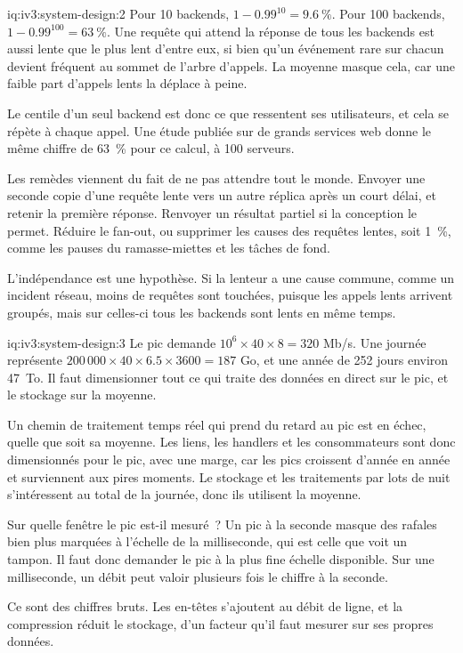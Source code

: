 \begin{solution}{iq:iv3:system-design:2}
Pour 10 backends, $1 - 0.99^{10} = 9.6~\%$. Pour 100 backends, $1 - 0.99^{100} = 63~\%$. Une requête qui attend la réponse de tous les backends est aussi lente que le plus lent d'entre eux, si bien qu'un événement rare sur chacun devient fréquent au sommet de l'arbre d'appels. La moyenne masque cela, car une faible part d'appels lents la déplace à peine.

Le centile d'un seul backend est donc ce que ressentent ses utilisateurs, et cela se répète à chaque appel. Une étude publiée sur de grands services web donne le même chiffre de 63~\% pour ce calcul, à 100 serveurs.

Les remèdes viennent du fait de ne pas attendre tout le monde. Envoyer une seconde copie d'une requête lente vers un autre réplica après un court délai, et retenir la première réponse. Renvoyer un résultat partiel si la conception le permet. Réduire le fan-out, ou supprimer les causes des requêtes lentes, soit 1~\%, comme les pauses du ramasse-miettes et les tâches de fond.

L'indépendance est une hypothèse. Si la lenteur a une cause commune, comme un incident réseau, moins de requêtes sont touchées, puisque les appels lents arrivent groupés, mais sur celles-ci tous les backends sont lents en même temps.

\end{solution}

\begin{solution}{iq:iv3:system-design:3}
Le pic demande $10^6 \times 40 \times 8 = 320$ Mb/s. Une journée représente $200\,000 \times 40 \times 6.5 \times 3600 = 187$ Go, et une année de 252 jours environ 47~To. Il faut dimensionner tout ce qui traite des données en direct sur le pic, et le stockage sur la moyenne.

Un chemin de traitement temps réel qui prend du retard au pic est en échec, quelle que soit sa moyenne. Les liens, les handlers et les consommateurs sont donc dimensionnés pour le pic, avec une marge, car les pics croissent d'année en année et surviennent aux pires moments. Le stockage et les traitements par lots de nuit s'intéressent au total de la journée, donc ils utilisent la moyenne.

Sur quelle fenêtre le pic est-il mesuré~? Un pic à la seconde masque des rafales bien plus marquées à l'échelle de la milliseconde, qui est celle que voit un tampon. Il faut donc demander le pic à la plus fine échelle disponible. Sur une milliseconde, un débit peut valoir plusieurs fois le chiffre à la seconde.

Ce sont des chiffres bruts. Les en-têtes s'ajoutent au débit de ligne, et la compression réduit le stockage, d'un facteur qu'il faut mesurer sur ses propres données.

\end{solution}

